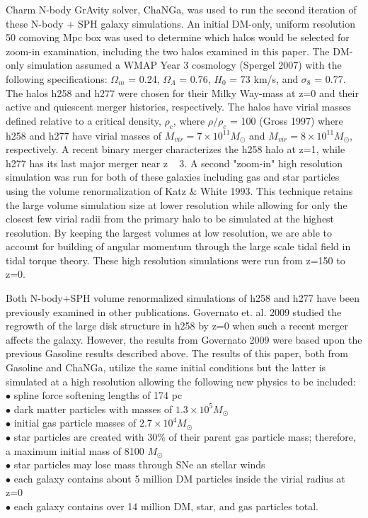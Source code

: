 \documentclass[manuscript]{aastex}
\begin{document}
	Charm N-body GrAvity solver, ChaNGa, was used to run the second iteration of these N-body + SPH galaxy simulations. An initial DM-only, uniform resolution 50 comoving Mpc box was used to determine which halos would be selected for zoom-in examination, including the two halos examined in this paper. The DM-only simulation assumed a WMAP Year 3 cosmology (Spergel 2007) with the following specifications: $\Omega _m$ = 0.24, $\Omega _{\Lambda}$ = 0.76, $H_0$ = 73 km/s, and $\sigma _8$ = 0.77. The halos h258 and h277  were chosen for their Milky Way-mass at z=0 and their active and quiescent merger histories, respectively. The halos have virial masses defined relative to a critical density, $\rho _c$, where $\rho / \rho _c$ = 100 (Gross 1997) where h258 and h277 have virial masses of $M_{vir} = 7 \times 10^{11} M_\odot$ and $M_{vir} = 8 \times 10^{11} M_\odot$, respectively. A recent binary merger characterizes the h258 halo at z=1, while h277 has its last major merger near z ~ 3. A second "zoom-in" high resolution simulation was run for both of these galaxies including gas and star particles using the volume renormalization of Katz \& White 1993. This technique retains the large volume simulation size at lower resolution while allowing for only the closest few virial radii from the primary halo to be simulated at the highest resolution. By keeping the largest volumes at low resolution, we are able to account for building of angular momentum through the large scale tidal field in tidal torque theory. These high resolution simulations were run from z=150 to z=0.

	Both N-body+SPH volume renormalized simulations of h258 and h277 have been previously examined in other publications. Governato et. al. 2009 studied the regrowth of the large disk structure in h258 by z=0 when such a recent merger affects the galaxy. However, the results from Governato 2009 were based upon the previous Gasoline results described above. The results of this paper, both from Gasoline and ChaNGa, utilize the same initial conditions but the latter is simulated at a high resolution allowing the following new physics to be included:\\
	$\bullet$ spline force softening lengths of 174 pc\\
	$\bullet$ dark matter particles with masses of $1.3 \times 10^5 M_\odot$\\
	$\bullet$ initial gas particle masses of $2.7 \times 10^4 M_\odot$\\
	$\bullet$ star particles are created with 30\% of their parent gas particle mass; therefore, a maximum initial mass of 8100 $M_{\odot}$\\
	$\bullet$ star particles may lose mass through SNe an stellar winds\\
	$\bullet$ each galaxy contains about 5 million DM particles inside the virial radius at z=0 \\
	$\bullet$ each galaxy contains over 14 million DM, star, and gas particles total.\\
	
\end{document}
